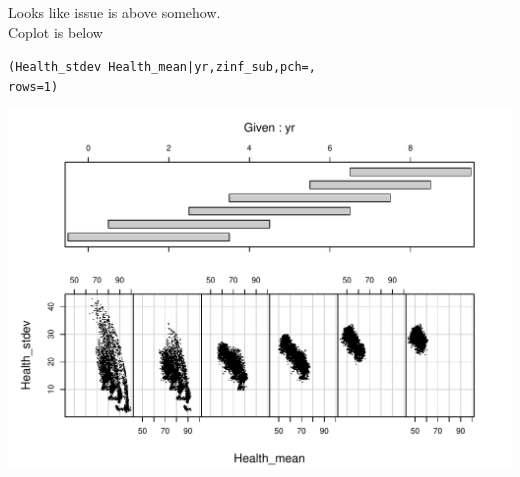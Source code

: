 \documentclass[11pt]{article}
\begin{document}
Looks like issue is above somehow.\\  Coplot is below
\begin{knitrout}
\color{fgcolor}\begin{kframe}
\begin{alltt}
(Health_stdev ~ Health_mean | yr, zinf_sub, pch = , 
    rows = 1)
\end{alltt}
\end{kframe}

{\centering \includegraphics{figure/co-plot} 

}



\end{knitrout}
\end{document}
